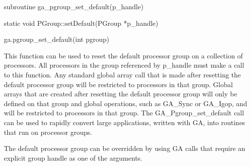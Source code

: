 \documentclass[12pt]{article}
\begin{document}
\begin{fapi}
\begin{fcode}
subroutine ga_pgroup_set_default(p_handle)
\end{fcode}
\begin{funcargs}
\end{funcargs}
\end{fapi}

\begin{cxxapi}
\begin{cxxcode}
static void PGroup::setDefault(PGroup *p_handle)
\end{cxxcode}
\begin{funcargs}
\end{funcargs}
\end{cxxapi}

\begin{pyapi}
\begin{pycode}
ga.pgroup_set_default(int pgroup)
\end{pycode}
\begin{funcargs}
\end{funcargs}
\end{pyapi}

\gcoll

\begin{desc}

This function can be used to reset the default processor group on a collection
of processors. All processors in the group referenced by p_handle must make a
call to this function. Any standard global array call that is made after
resetting the default processor group will be restricted to processors in that
group. Global arrays that are created after resetting the default processor
group will only be defined on that group and global operations, such as GA_Sync
or GA_Igop, and will be restricted to processors in that group. The
GA_Pgroup_set_default call can be used to rapidly convert large applications,
written with GA, into routines that run on processor groups.

The default processor group can be overridden by using GA calls that require an
explicit group handle as one of the arguments.

\end{desc}


\end{document}
